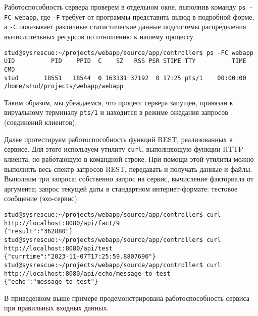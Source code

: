 \documentclass{studrep}
\begin{document}
Работоспособность сервера проверем в отдельном окне, выполнив команду \texttt{ps -FC webapp}, где \texttt{-F} требует от программы представить вывод в подробной форме, а \texttt{-C} показывает различные статистические данные подсистемы распределения вычислительных ресурсов по отношению к нашему процессу.

\begin{verbatim}
stud@sysrescue:~/projects/webapp/source/app/controller$ ps -FC webapp
UID          PID    PPID  C    SZ   RSS PSR STIME TTY          TIME CMD
stud       18551   18544  0 163131 37192  0 17:25 pts/1    00:00:00 /home/stud/projects/webapp/webapp
\end{verbatim}
Таким образом, мы убеждаемся, что процесс сервера запущен, привязан к вируальному терминалу \texttt{pts/1} и находится в режиме ожедания запросов (соединений клиентов).

Далее протестируем работоспособность функций REST, реализованных в сервисе. Для этого используем утилиту \texttt{curl}, выполняющую функции HTTP-клиента, но работающую в командной строке.  При помощи этой утилиты можно выполнять весь спектр запросов REST, передавать и получать данные и файлы.  Выполним три запроса: собственно запрос на сервис, вычисление факториала от аргумента; запрос текущей даты в стандартном интернет-формате; тестовое сообщение (эхо-сервис).

\begin{verbatim}
stud@sysrescue:~/projects/webapp/source/app/controller$ curl http://localhost:8080/api/fact/9
{"result":"362880"}
stud@sysrescue:~/projects/webapp/source/app/controller$ curl http://localhost:8080/api/test
{"currtime":"2023-11-07T17:25:59.8807696"}
stud@sysrescue:~/projects/webapp/source/app/controller$ curl http://localhost:8080/api/echo/message-to-test
{"echo":"message-to-test"}
\end{verbatim}
В приведенном выше примере продемонстрирована работоспособность сервиса при правильных входных данных.
\end{document}
